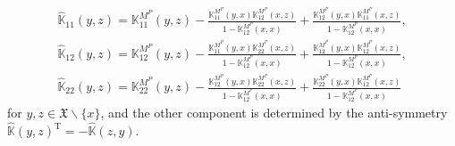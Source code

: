 \documentclass[11pt]{article}
\numberwithin{equation}{section}
\numberwithin{equation}{section}
\newcommand{\mfrak}[1]{\mathfrak{#1}}
\newcommand{\mbb}[1]{\mathbb{#1}}
\newcommand{\mrm}[1]{\mathrm{#1}}
\newcommand{\what}[1]{\widehat{#1}}
\begin{document}
\begin{gather*}
\what{\mbb{K}}_{11}(y,z) =\mbb{K}^{M^{P}}_{11}(y,z)-\frac{\mbb{K}^{M^{P}}_{11}(y,x)\mbb{K}^{M^{P}}_{12}(x,z)}{1-\mbb{K}^{M^{P}}_{12}(x,x)}+\frac{\mbb{K}^{M^{P}}_{12}(y,x)\mbb{K}^{M^{P}}_{11}(x,z)}{1-\mbb{K}^{M^{P}}_{12}(x,x)}, \\
\what{\mbb{K}}_{12}(y,z) =\mbb{K}^{M^{P}}_{12}(y,z)-\frac{\mbb{K}^{M^{P}}_{11}(y,x)\mbb{K}^{M^{P}}_{22}(x,z)}{1-\mbb{K}^{M^{P}}_{12}(x,x)}+\frac{\mbb{K}^{M^{P}}_{12}(y,x)\mbb{K}^{M^{P}}_{12}(x,z)}{1-\mbb{K}^{M^{P}}_{12}(x,x)}, \\
\what{\mbb{K}}_{22}(y,z) =\mbb{K}^{M^{P}}_{22}(y,z)-\frac{\mbb{K}^{M^{P}}_{12}(y,x)\mbb{K}^{M^{P}}_{22}(x,z)}{1-\mbb{K}^{M^{P}}_{12}(x,x)}+\frac{\mbb{K}^{M^{P}}_{22}(y,x)\mbb{K}^{M^{P}}_{12}(x,z)}{1-\mbb{K}^{M^{P}}_{12}(x,x)}
\end{gather*}
for $y,z\in\mfrak{X}\backslash\{x\}$, and the other component is determined by the anti-symmetry $\what{\mbb{K}}(y,z)^{\mrm{T}}=-\what{\mbb{K}}(z,y)$.
\end{document}
